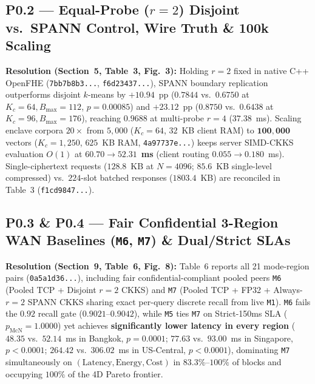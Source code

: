 \documentclass[10pt]{article}
\begin{document}
\subsection*{P0.2 --- Equal-Probe ($r=2$) Disjoint vs.\ SPANN Control, Wire Truth \& 100k Scaling}
\textbf{Resolution (Section~5, Table~3, Fig.~3):} Holding $r=2$ fixed in native C++ OpenFHE (\texttt{7bb7b8b3...}, \texttt{f6d23437...}), SPANN boundary replication outperforms disjoint $k$-means by $+10.94$~pp ($0.7844$ vs.\ $0.6750$ at $K_c=64, B_{\max}=112$, $p=0.00085$) and $+23.12$~pp ($0.8750$ vs.\ $0.6438$ at $K_c=96, B_{\max}=176$), reaching $0.9688$ at multi-probe $r=4$ ($37.38$~ms). Scaling enclave corpora $20\times$ from $5{,}000$ ($K_c=64$, $32$~KB client RAM) to $\mathbf{100{,}000}$ vectors ($K_c=1{,}250$, $625$~KB RAM, \texttt{4a97737e...}) keeps server SIMD-CKKS evaluation $O(1)$ at $\mathbf{60.70\rightarrow 52.31}$~\textbf{ms} (client routing $0.055\rightarrow 0.180$~ms). Single-ciphertext requests ($128.8$~KB at $N=4096$; $85.6$~KB single-level compressed) vs.\ $224$-slot batched responses ($1803.4$~KB) are reconciled in Table~3 (\texttt{f1cd9847...}).

\subsection*{P0.3 \& P0.4 --- Fair Confidential 3-Region WAN Baselines (\texttt{M6}, \texttt{M7}) \& Dual/Strict SLAs}
\textbf{Resolution (Section~9, Table~6, Fig.~8):} Table~6 reports all 21 mode-region pairs (\texttt{0a5a1d36...}), including fair confidential-compliant pooled peers \texttt{M6} (Pooled TCP + Disjoint $r=2$ CKKS) and \texttt{M7} (Pooled TCP + FP32 + Always-$r=2$ SPANN CKKS sharing exact per-query discrete recall from live \texttt{M1}). \texttt{M6} fails the $0.92$ recall gate ($0.9021$--$0.9042$), while \texttt{M5} ties \texttt{M7} on Strict-150ms SLA ($p_{\mathrm{McN}}=1.0000$) yet achieves \textbf{significantly lower latency in every region} ($48.35$ vs.\ $52.14$~ms in Bangkok, $p=0.0001$; $77.63$ vs.\ $93.00$~ms in Singapore, $p<0.0001$; $264.42$ vs.\ $306.02$~ms in US-Central, $p<0.0001$), dominating \texttt{M7} simultaneously on $(\text{Latency}, \text{Energy}, \text{Cost})$ in $83.3\%$--$100\%$ of blocks and occupying $100\%$ of the 4D Pareto frontier.
\end{document}
